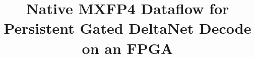 ﻿\documentclass[conference]{IEEEtran}
\begin{document}
\title{Native MXFP4 Dataflow for Persistent Gated DeltaNet Decode on an FPGA\\
}


\author{
}

\maketitle
\end{document}
